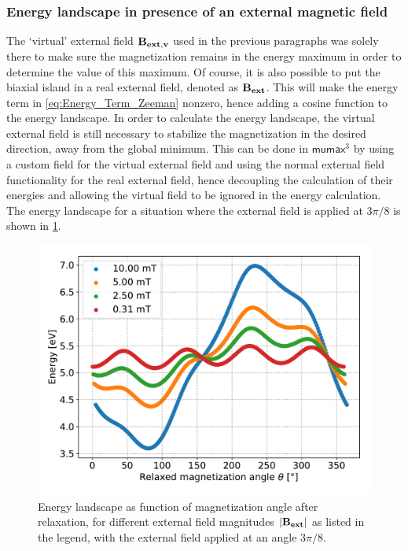 \documentclass[11pt,a4paper,english]{article}
\newcommand{\mumax}{$\mathsf{mumax}^3$}
\begin{document}
\subsubsection{Energy landscape in presence of an external magnetic field}
The `virtual' external field $\vb{B_{ext,v}}$ used in the previous paragraphs was solely there to make sure the magnetization remains in the energy maximum in order to determine the value of this maximum. Of course, it is also possible to put the biaxial island in a real external field, denoted as $\vb{B_{ext}}$. This will make the energy term in \cref{eq:Energy_Term_Zeeman} nonzero, hence adding a cosine function to the energy landscape. In order to calculate the energy landscape, the virtual external field is still necessary to stabilize the magnetization in the desired direction, away from the global minimum. This can be done in \mumax{} by using a custom field for the virtual external field and using the normal external field functionality for the real external field, hence decoupling the calculation of their energies and allowing the virtual field to be ignored in the energy calculation. The energy landscape for a situation where the external field is applied at $3\pi/8$ is shown in \cref{fig:barrierLandscape_extField}.
\begin{figure}
    \centering
    \includegraphics[width=0.9\columnwidth]{Figures/biaxial_island/BarrierLandscape/Ext_K0.1Ms2_Bext1e-2-1e-4_a3Pi8.pdf}
    \caption{Energy landscape as function of magnetization angle after relaxation, for different external field magnitudes $\abs{\vb{B_{ext}}}$ as listed in the legend, with the external field applied at an angle $3\pi/8$.}
    \label{fig:barrierLandscape_extField}
\end{figure}
\end{document}
